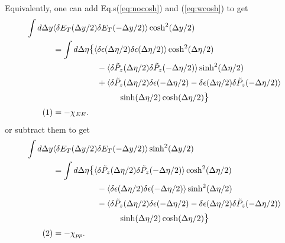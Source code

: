 \documentclass[12pt]{article}
\numberwithin{equation}{section}
\numberwithin{figure}{section}
\newcommand\eqnumber{\addtocounter{equation}{1}\tag{\theequation}}
\begin{document}
Equivalently, one can add  Eq.s(\ref{eq:nocosh}) and (\ref{eq:wcosh}) to get
\begin{align*}
\int d\Delta y&\langle \delta E_T(\Delta y/2)\delta E_T(-\Delta y/2)\rangle\cosh^2(\Delta y/2)\\
&=\int d\Delta\eta\mathlarger{\{}   \langle \delta\epsilon(\Delta\eta/2)\delta\epsilon(\Delta\eta/2)\rangle\cosh^2(\Delta\eta/2)\\
&~~~~~~~~~~~~~~~~-\langle\delta\tilde{P}_z(\Delta\eta/2)\delta\tilde{P}_z(-\Delta\eta/2)\rangle\sinh^2(\Delta\eta/2)\\
&~~~~~~~~~~~~~~~~+\langle \delta\tilde{P}_z(\Delta\eta/2)\delta\epsilon(-\Delta\eta/2)-\delta\epsilon(\Delta\eta/2)\delta\tilde{P}_z(-\Delta\eta/2)\rangle\\
&\hspace*{80pt}\sinh(\Delta \eta/2)\cosh(\Delta \eta/2)\mathlarger{\}}\\
\eqnumber\label{eq:alt1}
&=-\chi_{EE}.
\end{align*}
or subtract them to get
\begin{align*}
\int d\Delta y&\langle \delta E_T(\Delta y/2)\delta E_T(-\Delta y/2)\rangle\sinh^2(\Delta y/2)\\
&=\int d\Delta\eta\mathlarger{\{}\langle\delta\tilde{P}_z(\Delta\eta/2)\delta\tilde{P}_z(-\Delta\eta/2)\rangle\cosh^2(\Delta\eta/2)\\
&~~~~~~~~~~~~~~~~-\langle \delta\epsilon(\Delta\eta/2)\delta\epsilon(-\Delta\eta/2)\rangle\sinh^2(\Delta\eta/2)\\
&~~~~~~~~~~~~~~~~-\langle \delta\tilde{P}_z(\Delta\eta/2)\delta\epsilon(-\Delta\eta/2)-\delta\epsilon(\Delta\eta/2)\delta\tilde{P}_z(-\Delta\eta/2)\rangle\\
&\hspace*{80pt}\sinh(\Delta \eta/2)\cosh(\Delta \eta/2)\mathlarger{\}}\\
\eqnumber\label{eq:alt2}
&=-\chi_{pp}.
\end{align*}
\end{document}
